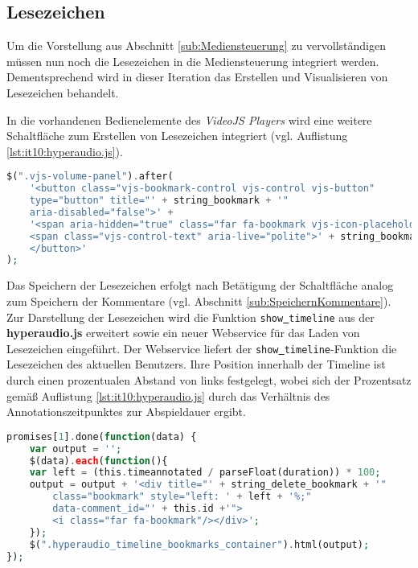 
\subsection{Lesezeichen}
Um die Vorstellung aus Abschnitt \ref{sub:Mediensteuerung} zu vervollständigen müssen nun noch die Lesezeichen in die Mediensteuerung integriert werden. Dementsprechend wird in dieser Iteration das Erstellen und Visualisieren von Lesezeichen behandelt.

In die vorhandenen Bedienelemente des \textit{VideoJS Players} wird eine weitere Schaltfläche zum Erstellen von Lesezeichen integriert (vgl. Auflistung \ref{lst:it10:hyperaudio.js}).

\begin{lstlisting}[language=php,
             linewidth=\textwidth,
             caption={Ausschnitt der \textbf{hyperaudio.js} in der 10. Iteration},
             label={lst:it10:hyperaudio.js}]
$(".vjs-volume-panel").after(
    '<button class="vjs-bookmark-control vjs-control vjs-button"
    type="button" title="' + string_bookmark + '"
    aria-disabled="false">' +
    '<span aria-hidden="true" class="far fa-bookmark vjs-icon-placeholder"></span>
    <span class="vjs-control-text" aria-live="polite">' + string_bookmark + '</span>
    </button>'
);
\end{lstlisting}

Das Speichern der Lesezeichen erfolgt nach Betätigung der Schaltfläche analog zum Speichern der Kommentare (vgl. Abschnitt \ref{sub:SpeichernKommentare}). Zur Darstellung der Lesezeichen wird die Funktion \texttt{show\underline{{ }}timeline} aus der \textbf{hyperaudio.js} erweitert sowie ein neuer Webservice für das Laden von Lesezeichen eingeführt. Der Webservice liefert der \texttt{show\underline{{ }}timeline}-Funktion die Lesezeichen des aktuellen Benutzers. Ihre Position innerhalb der Timeline ist durch einen prozentualen Abstand von links festgelegt, wobei sich der Prozentsatz gemäß Auflistung \ref{lst:it10:hyperaudio.js} durch das Verhältnis des Annotationszeitpunktes zur Abspieldauer ergibt. 

\begin{lstlisting}[language=php,
             linewidth=\textwidth,
             caption={Ausschnitt der \textbf{hyperaudio.js} in der 10. Iteration},
             label={lst:it10:hyperaudio.js}]
promises[1].done(function(data) {
    var output = '';
    $(data).each(function(){
    var left = (this.timeannotated / parseFloat(duration)) * 100;
    output = output + '<div title="' + string_delete_bookmark + '" 
        class="bookmark" style="left: ' + left + '%;" 
        data-comment_id="' + this.id +'">
        <i class="far fa-bookmark"/></div>';
    });
    $(".hyperaudio_timeline_bookmarks_container").html(output);
});
\end{lstlisting}

